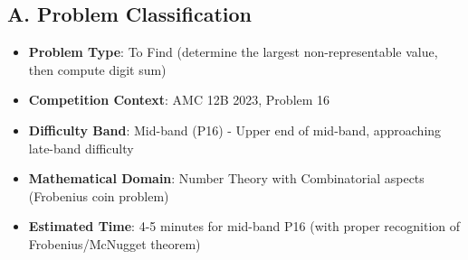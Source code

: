 \documentclass[12pt]{article}
\begin{document}
\begin{problemconfigbox}
\subsection*{A. Problem Classification}
\begin{itemize}[leftmargin=*]
    \item \textbf{Problem Type}: To Find (determine the largest non-representable value, then compute digit sum)
    \item \textbf{Competition Context}: AMC 12B 2023, Problem 16
    \item \textbf{Difficulty Band}: Mid-band (P16) - Upper end of mid-band, approaching late-band difficulty
    \item \textbf{Mathematical Domain}: Number Theory with Combinatorial aspects (Frobenius coin problem)
    \item \textbf{Estimated Time}: 4-5 minutes for mid-band P16 (with proper recognition of Frobenius/McNugget theorem)
\end{itemize}


\end{problemconfigbox}
\end{document}
